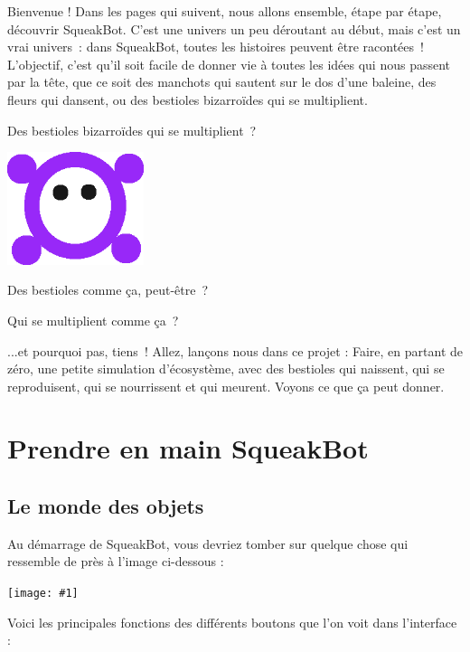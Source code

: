 \documentclass[a4paper,12pt]{book}
\def\appName{SqueakBot}
\newcommand{\capture}[1]
{
\begin{center}
	\texttt{[image: \#1]}
\end{center}
}
\begin{document}
Bienvenue ! Dans les pages qui suivent, nous allons ensemble, étape par étape,
découvrir \appName. C'est une univers un peu déroutant au début, mais c'est un
vrai univers~: dans \appName, toutes les histoires peuvent être racontées~!
L'objectif, c'est qu'il soit facile de donner vie à toutes les idées qui nous
passent par la tête, que ce soit des manchots qui sautent sur le dos d'une
baleine, des fleurs qui dansent, ou des bestioles bizarroïdes qui se
multiplient.

Des bestioles bizarroïdes qui se multiplient~?

\begin{center} \includegraphics[width=4cm]{bestiole.png} \end{center}

Des bestioles comme ça, peut-être~?


Qui se multiplient comme ça~?

...et pourquoi pas, tiens~! Allez, lançons nous dans ce projet : Faire, en
partant de zéro, une petite simulation d'écosystème, avec des bestioles qui
naissent, qui se reproduisent, qui se nourrissent et qui meurent. Voyons ce que
ça peut donner.

\chapter{Prendre en main \appName}

\section{Le monde des objets}

Au démarrage de \appName, vous devriez tomber sur quelque chose qui ressemble
de près à l'image ci-dessous :

\capture{0.png}

Voici les principales fonctions des différents boutons que l'on voit dans
l'interface :
\end{document}
